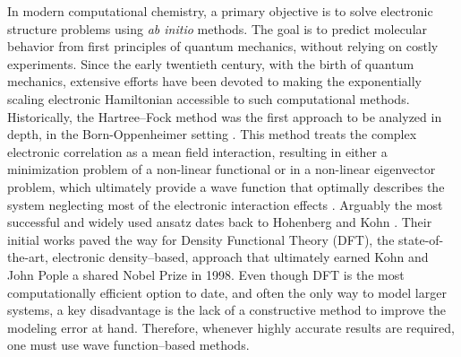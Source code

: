 \documentclass[reqno]{amsart}
\begin{document}
In modern computational chemistry, a primary objective is to solve electronic structure problems using \textit{ab initio} methods. The goal is to predict molecular behavior from first principles of quantum mechanics, without relying on costly experiments. Since the early twentieth century, with the birth of quantum mechanics, extensive efforts have been devoted to making the exponentially scaling electronic Hamiltonian accessible to such computational methods. Historically, the Hartree–Fock method was the first approach to be analyzed in depth, in the Born-Oppenheimer setting \cite{Slater, Hartree_1928, FockNherungsmethodeZL}. This method treats the complex electronic correlation as a mean field interaction, resulting in either a minimization problem of a non-linear functional or in a non-linear eigenvector problem, which ultimately provide a wave function that optimally describes the system neglecting most of the electronic interaction effects \cite{hartree1957calculation, roothaan,szabo,helgakar}.   Arguably the most successful and widely used ansatz dates back to Hohenberg and Kohn \cite{HohenbergUKohn}. Their initial works paved the way for Density Functional Theory (DFT), the state-of-the-art, electronic density–based, approach that ultimately earned Kohn and John Pople a shared Nobel Prize in 1998. Even though DFT is the most computationally efficient option to date, and often the only way to model larger systems, a key disadvantage is the lack of a constructive method to improve the modeling error at hand. Therefore, whenever highly accurate results are required, one must use wave function–based methods.  \\ 
\newline
\end{document}
